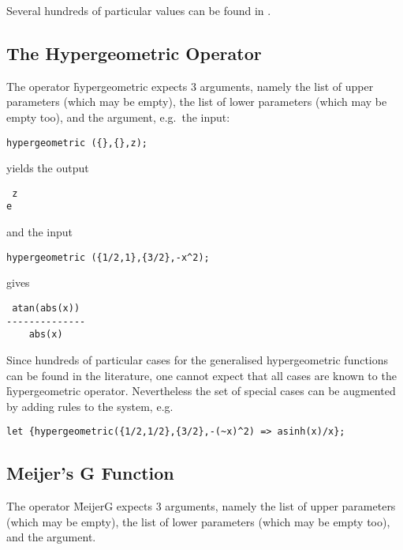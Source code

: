 Several hundreds of particular values can be found in \cite{Prudnikov:90c}.

\hypertarget{operator:HYPERGEOMETRIC}{}
\subsection{The Hypergeometric Operator}

The operator \f{hypergeometric} expects 3 arguments, namely the 
list of upper parameters (which may be empty), the list of lower
parameters (which may be empty too), and the argument, e.g.\ the input:
\begin{verbatim}
hypergeometric ({},{},z);
\end{verbatim}
yields the output
\begin{verbatim}
 z
e
\end{verbatim}
and the input
\begin{verbatim}
hypergeometric ({1/2,1},{3/2},-x^2);
\end{verbatim}
gives
\begin{verbatim}
 atan(abs(x))
--------------
    abs(x)
\end{verbatim}


Since hundreds of particular cases for the generalised hypergeometric
functions can be found in the literature, one cannot expect that all
cases are known to the \f{hypergeometric} operator.
Nevertheless the set of special cases can be augmented by adding
rules to the \REDUCE{} system, e.g.
\begin{verbatim}
let {hypergeometric({1/2,1/2},{3/2},-(~x)^2) => asinh(x)/x};
\end{verbatim}

\subsection{Meijer's G Function}
\hypertarget{operator:MEIJERG}{}

The operator \f{MeijerG} expects 3 arguments, namely the 
list of upper parameters (which may be empty), the list of lower
parameters (which may be empty too), and the argument.

